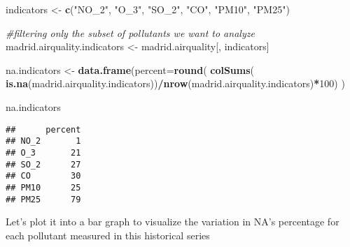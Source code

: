 \documentclass[
]{article}
\newenvironment{Shaded}{\begin{snugshade}}{\end{snugshade}}
\newcommand{\CommentTok}[1]{\textcolor[rgb]{0.56,0.35,0.01}{\textit{#1}}}
\newcommand{\DataTypeTok}[1]{\textcolor[rgb]{0.13,0.29,0.53}{#1}}
\newcommand{\DecValTok}[1]{\textcolor[rgb]{0.00,0.00,0.81}{#1}}
\newcommand{\KeywordTok}[1]{\textcolor[rgb]{0.13,0.29,0.53}{\textbf{#1}}}
\newcommand{\NormalTok}[1]{#1}
\newcommand{\OperatorTok}[1]{\textcolor[rgb]{0.81,0.36,0.00}{\textbf{#1}}}
\newcommand{\StringTok}[1]{\textcolor[rgb]{0.31,0.60,0.02}{#1}}
\begin{document}
\begin{Shaded}
\begin{Highlighting}[]
\NormalTok{indicators <-}\StringTok{ }\KeywordTok{c}\NormalTok{(}\StringTok{"NO_2"}\NormalTok{, }\StringTok{"O_3"}\NormalTok{, }\StringTok{"SO_2"}\NormalTok{, }\StringTok{"CO"}\NormalTok{, }\StringTok{"PM10"}\NormalTok{, }\StringTok{"PM25"}\NormalTok{)}

\CommentTok{#filtering only the subset of pollutants we want to analyze}
\NormalTok{madrid.airquality.indicators <-}\StringTok{ }\NormalTok{madrid.airquality[, indicators]}

\NormalTok{na.indicators <-}\StringTok{ }\KeywordTok{data.frame}\NormalTok{(}\DataTypeTok{percent=}\KeywordTok{round}\NormalTok{(}
  \KeywordTok{colSums}\NormalTok{(}
    \KeywordTok{is.na}\NormalTok{(madrid.airquality.indicators))}\OperatorTok{/}\KeywordTok{nrow}\NormalTok{(madrid.airquality.indicators)}\OperatorTok{*}\DecValTok{100}\NormalTok{)}
\NormalTok{  )}

\NormalTok{na.indicators}
\end{Highlighting}
\end{Shaded}

\begin{verbatim}
##      percent
## NO_2       1
## O_3       21
## SO_2      27
## CO        30
## PM10      25
## PM25      79
\end{verbatim}

Let's plot it into a bar graph to visualize the variation in NA's
percentage for each pollutant measured in this historical series
\end{document}
